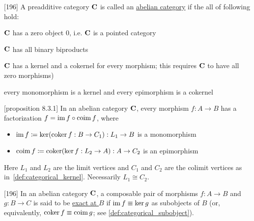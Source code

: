 \begin{definition}\label{def:abelian_category}\cite{MacLane1994}[196]
  A preadditive category $\operatorname{\mathbf{C}}$ is called an \uline{abelian category} if the all of following hold:
  \begin{defenum}
    \item $\operatorname{\mathbf{C}}$ has a zero object $0$, i.e. $\operatorname{\mathbf{C}}$ is a pointed category
    \item $\operatorname{\mathbf{C}}$ has all binary biproducts
    \item $\operatorname{\mathbf{C}}$ has a kernel and a cokernel for every morphism; this requires $\operatorname{\mathbf{C}}$ to have all zero morphisms)
    \item every monomorphism is a kernel and every epimorphism is a cokernel
  \end{defenum}
\end{definition}

\begin{proposition}\label{def:abelian_category_morphism_factorization}\cite{MacLane1994}[proposition 8.3.1]
  In an abelian category $\operatorname{\mathbf{C}}$, every morphism $f: A \to B$ has a factorization $f = \operatorname{im} f \circ \operatorname{coim} f$, where
  \begin{itemize}
    \item $\operatorname{im} f \coloneqq \operatorname{ker}(\operatorname{coker} f: B \to C_1): L_1 \to B$ is a monomorphism
    \item $\operatorname{coim} f \coloneqq \operatorname{coker}(\operatorname{ker} f: L_2 \to A): A \to C_2$ is an epimorphism
  \end{itemize}
  Here $L_1$ and $L_2$ are the limit vertices and $C_1$ and $C_2$ are the colimit vertices as in~\cref{def:categorical_kernel}. Necessarily $L_1 \cong C_2$.
\end{proposition}

\begin{definition}\label{def:exact_morphism_pair}\cite{MacLane1994}[196]
  In an abelian category $\operatorname{\mathbf{C}}$, a composable pair of morphisms $f: A \to B$ and $g: B \to C$ is said to be \uline{exact at $B$} if $\operatorname{im} f \equiv \operatorname{ker} g$ as subobjects of $B$ (or, equivalently, $\operatorname{coker} f \equiv \operatorname{coim} g$; see \cref{def:categorical_subobject}).
\end{definition}

